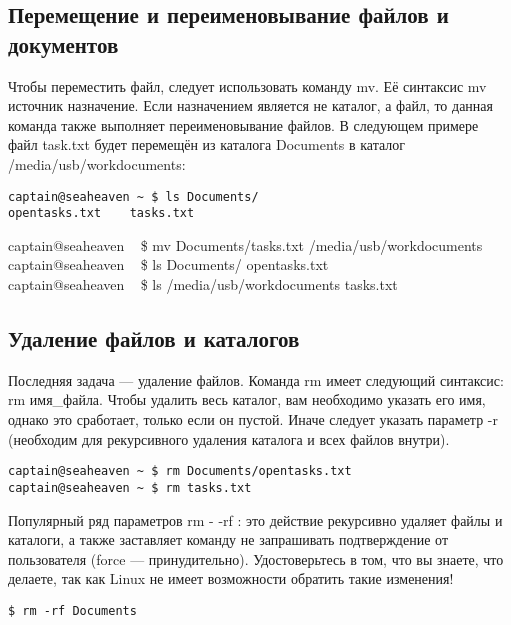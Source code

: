 \documentclass[12pt]{book}
\begin{document}
\subsection{Перемещение и переименовывание файлов и документов}
Чтобы переместить файл, следует использовать команду mv. Её синтаксис mv источник назначение. Если назначением является не каталог, а файл, то данная команда также выполняет переименовывание файлов. В следующем примере файл task.txt будет перемещён из каталога Documents в каталог /media/usb/workdocuments:

\vspace{3mm}
\begin{tcolorbox}
\begin{lstlisting}
captain@seaheaven ~ $ ls Documents/
opentasks.txt	 tasks.txt
\end{lstlisting}
captain@seaheaven ~ \$ mv Documents/tasks.txt /media/usb/workdocuments \\
captain@seaheaven ~ \$ ls Documents/
opentasks.txt \\
captain@seaheaven ~ \$ ls /media/usb/workdocuments
tasks.txt
\end{tcolorbox}

\subsection{Удаление файлов и каталогов}

Последняя задача — удаление файлов. Команда rm имеет следующий синтаксис: rm имя\_файла. Чтобы удалить весь каталог, вам необходимо указать его имя, однако это сработает, только если он пустой. Иначе следует указать параметр -r  (необходим для рекурсивного удаления каталога и всех файлов внутри).

\vspace{3mm}
\begin{tcolorbox}
\begin{lstlisting}
captain@seaheaven ~ $ rm Documents/opentasks.txt
captain@seaheaven ~ $ rm tasks.txt
\end{lstlisting}
\end{tcolorbox}

Популярный ряд параметров rm - -rf : это действие рекурсивно удаляет файлы и каталоги, а также заставляет команду не запрашивать подтверждение от пользователя (force — принудительно). Удостоверьтесь в том, что вы знаете, что делаете, так как Linux не имеет возможности обратить такие изменения! 

\vspace{3mm}
\begin{tcolorbox}
\begin{lstlisting}
$ rm -rf Documents
\end{lstlisting}
\end{tcolorbox}
\end{document}
